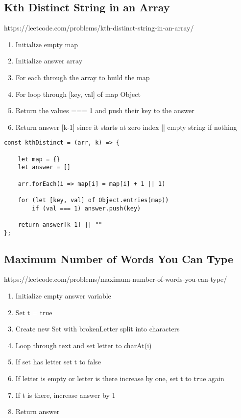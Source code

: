 \documentclass[10pt]{article}
\begin{document}
\subsection{Kth Distinct String in an Array}
https://leetcode.com/problems/kth-distinct-string-in-an-array/
\begin{enumerate}
	\item Initialize empty map 
	\item Initialize answer array 
	\item For each through the array to build the map
	\item For loop through [key, val] of map Object 
	\item Return the values === 1 and push their key to the answer
	\item Return answer [k-1] since it starts at zero index || empty string if nothing
\end{enumerate}

\begin{lstlisting}[title=Solution kthDistinct, captionpos=t]
const kthDistinct = (arr, k) => {
    
    let map = {} 
    let answer = [] 
    
    arr.forEach(i => map[i] = map[i] + 1 || 1)
    
    for (let [key, val] of Object.entries(map)) 
        if (val === 1) answer.push(key)
    
    return answer[k-1] || ""
};
\end{lstlisting}

\medskip %







\pagebreak %
\medskip   
\subsection{Maximum Number of Words You Can Type}
https://leetcode.com/problems/maximum-number-of-words-you-can-type/

\begin{enumerate}
	\item Initialize empty answer variable
	\item Set t = true 
	\item Create new Set with brokenLetter split into characters
	\item Loop through text and set letter to charAt(i)
	\item If set has letter set t to false 
	\item If letter is empty or letter is there increase by one, set t to true again
	\item If t is there, increase answer by 1	
	\item Return answer
\end{enumerate}
\end{document}
